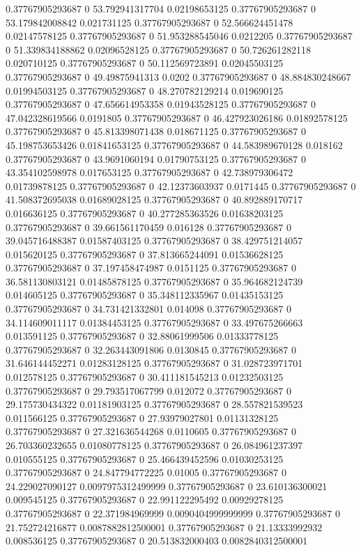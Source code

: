 0.37767905293687 0 53.792941317704 0.02198653125
0.37767905293687 0 53.179842008842 0.021731125
0.37767905293687 0 52.566624451478 0.02147578125
0.37767905293687 0 51.953288545046 0.0212205
0.37767905293687 0 51.339834188862 0.02096528125
0.37767905293687 0 50.726261282118 0.020710125
0.37767905293687 0 50.112569723891 0.02045503125
0.37767905293687 0 49.49875941313 0.0202
0.37767905293687 0 48.884830248667 0.01994503125
0.37767905293687 0 48.270782129214 0.019690125
0.37767905293687 0 47.656614953358 0.01943528125
0.37767905293687 0 47.042328619566 0.0191805
0.37767905293687 0 46.427923026186 0.01892578125
0.37767905293687 0 45.813398071438 0.018671125
0.37767905293687 0 45.198753653426 0.01841653125
0.37767905293687 0 44.583989670128 0.018162
0.37767905293687 0 43.9691060194 0.01790753125
0.37767905293687 0 43.354102598978 0.017653125
0.37767905293687 0 42.738979306472 0.01739878125
0.37767905293687 0 42.12373603937 0.0171445
0.37767905293687 0 41.508372695038 0.01689028125
0.37767905293687 0 40.892889170717 0.016636125
0.37767905293687 0 40.277285363526 0.01638203125
0.37767905293687 0 39.661561170459 0.016128
0.37767905293687 0 39.045716488387 0.01587403125
0.37767905293687 0 38.429751214057 0.015620125
0.37767905293687 0 37.813665244091 0.01536628125
0.37767905293687 0 37.197458474987 0.0151125
0.37767905293687 0 36.581130803121 0.01485878125
0.37767905293687 0 35.964682124739 0.014605125
0.37767905293687 0 35.348112335967 0.01435153125
0.37767905293687 0 34.731421332801 0.014098
0.37767905293687 0 34.114609011117 0.01384453125
0.37767905293687 0 33.497675266663 0.013591125
0.37767905293687 0 32.88061999506 0.01333778125
0.37767905293687 0 32.263443091806 0.0130845
0.37767905293687 0 31.646144452271 0.01283128125
0.37767905293687 0 31.028723971701 0.012578125
0.37767905293687 0 30.411181545213 0.01232503125
0.37767905293687 0 29.793517067799 0.012072
0.37767905293687 0 29.175730434322 0.01181903125
0.37767905293687 0 28.557821539523 0.011566125
0.37767905293687 0 27.93979027801 0.01131328125
0.37767905293687 0 27.321636544268 0.0110605
0.37767905293687 0 26.703360232655 0.01080778125
0.37767905293687 0 26.084961237397 0.010555125
0.37767905293687 0 25.466439452596 0.01030253125
0.37767905293687 0 24.847794772225 0.01005
0.37767905293687 0 24.229027090127 0.0097975312499999
0.37767905293687 0 23.610136300021 0.009545125
0.37767905293687 0 22.991122295492 0.00929278125
0.37767905293687 0 22.371984969999 0.0090404999999999
0.37767905293687 0 21.752724216877 0.0087882812500001
0.37767905293687 0 21.13333992932 0.008536125
0.37767905293687 0 20.513832000403 0.0082840312500001
